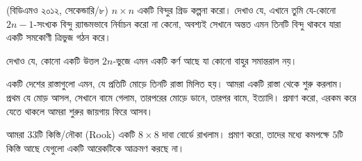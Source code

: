\begin{exercise}
	\item (বিডিএমও ২০১২, সেকেন্ডারি/৮) $n \times n$ একটি বিন্দুর গ্রিড কল্পনা করো। দেখাও যে, এখানে তুমি যে-কোনো $2n - 1$-সংখ্যক বিন্দু র‍্যান্ডমভাবে নির্বাচন করো না কেনো, অবশ্যই সেখানে অন্তত এমন তিনটি বিন্দু থাকবে যারা একটি সমকোণী ত্রিভুজ গঠন করে। 
	\item দেখাও যে, কোনো একটি উত্তল $2n$-ভুজে এমন একটি কর্ণ আছে যা কোনো বাহুর সমান্তরাল নয়।
	\item একটি দেশের রাস্তাগুলো এমন, যে প্রতিটি মোড়ে তিনটি রাস্তা মিলিত হয়। আমরা একটি রাস্তা থেকে শুরু করলাম। প্রথম যে মোড় আসল, সেখানে বামে গেলাম, তারপরের মোড়ে ডানে, তারপর বামে, ইত্যাদি। প্রমাণ করো, এরকম করে যেতে থাকলে আমরা শুরুর জায়গায় ফিরে আসব। 
	\item আমরা $33$টি কিস্তি/নৌকা (Rook) একটি $8 \times 8$ দাবা বোর্ডে রাখলাম। প্রমাণ করো, তাদের মধ্যে কমপক্ষে $5$টি কিস্তি আছে যেগুলো একটি আরেকটিকে আক্রমণ করছে না।
\end{exercise}
